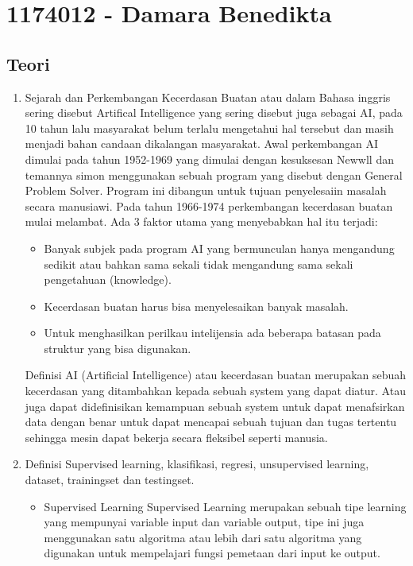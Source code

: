 \section{1174012 - Damara Benedikta }
\subsection{Teori}
\begin{enumerate}
	\item Sejarah dan Perkembangan
	\hfill\break
	Kecerdasan Buatan atau dalam Bahasa inggris sering disebut Artifical Intelligence yang sering disebut juga sebagai AI, pada 10 tahun lalu masyarakat belum terlalu mengetahui hal tersebut dan masih menjadi bahan candaan dikalangan masyarakat. Awal perkembangan AI dimulai pada tahun 1952-1969 yang dimulai dengan kesuksesan Newwll dan temannya simon menggunakan sebuah program yang disebut dengan General Problem Solver. Program ini dibangun untuk tujuan penyelesaiin masalah secara manusiawi. Pada tahun 1966-1974 perkembangan kecerdasan buatan mulai melambat. Ada 3 faktor utama yang menyebabkan hal itu terjadi:
	\begin{itemize}
		\item Banyak subjek pada program AI yang bermunculan hanya mengandung sedikit atau bahkan sama sekali tidak  mengandung sama sekali pengetahuan (knowledge).
		\item Kecerdasan buatan harus bisa menyelesaikan banyak masalah.
		\item Untuk menghasilkan perilkau intelijensia ada beberapa batasan pada struktur yang bisa digunakan.
	\end{itemize}
	Definisi AI (Artificial Intelligence) atau kecerdasan buatan merupakan sebuah kecerdasan yang ditambahkan kepada sebuah system yang dapat diatur. Atau juga dapat didefinisikan kemampuan sebuah system untuk dapat menafsirkan data dengan benar untuk dapat mencapai sebuah tujuan dan tugas tertentu sehingga mesin dapat bekerja secara fleksibel seperti manusia.
	\item Definisi
	\hfill\break
	Supervised learning, klasifikasi, regresi, unsupervised learning, dataset, trainingset dan testingset.
	\begin{itemize}
		\item Supervised Learning
		\hfill\break
		Supervised Learning merupakan sebuah tipe learning yang mempunyai variable input dan variable output, tipe ini juga menggunakan satu algoritma atau lebih dari satu algoritma yang digunakan untuk mempelajari fungsi  pemetaan dari input ke output.

\end{itemize}
\end{enumerate}
